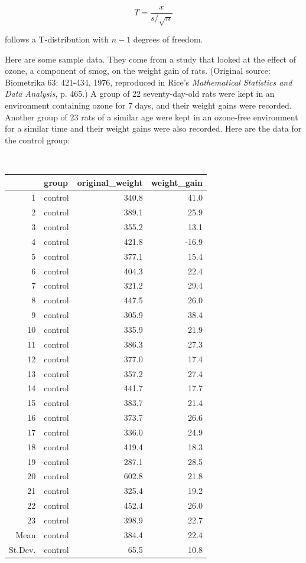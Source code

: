$$ T = \frac{\overline{x}}{s/\sqrt{n}}$$

\noindent follows a T-distribution with $n-1$ degrees of freedom. 

\begin{question}{}
Here are some sample data. They come from a study that looked at the effect of ozone, a component of smog, on the weight gain of rats. (Original source: Biometrika 63: 421-434, 1976, reproduced in Rice's \emph{Mathematical Statistics and Data Analysis}, p. 465.) A group of 22 seventy-day-old rats were kept in an environment containing ozone for $7$ days, and their weight gains were recorded. Another group of 23 rats of a similar age were kept in an ozone-free environment for a similar time and their weight gains were also recorded. Here are the data for the control group:

{\footnotesize \tt
\begin{center}
\begin{tabular}{rlrr}
  \toprule
  & group & original\_weight & weight\_gain \\ 
  \midrule
  1 & control & 340.8 & 41.0 \\ 
  2 & control & 389.1 & 25.9 \\ 
  3 & control & 355.2 & 13.1 \\ 
  4 & control & 421.8 & -16.9 \\ 
  5 & control & 377.1 & 15.4 \\ 
  6 & control & 404.3 & 22.4 \\ 
  7 & control & 321.2 & 29.4 \\ 
  8 & control & 447.5 & 26.0 \\ 
  9 & control & 305.9 & 38.4 \\ 
  10 & control & 335.9 & 21.9 \\ 
  11 & control & 386.3 & 27.3 \\ 
  12 & control & 377.0 & 17.4 \\ 
  13 & control & 357.2 & 27.4 \\ 
  14 & control & 441.7 & 17.7 \\ 
  15 & control & 383.7 & 21.4 \\ 
  16 & control & 373.7 & 26.6 \\ 
  17 & control & 336.0 & 24.9 \\ 
  18 & control & 419.4 & 18.3 \\ 
  19 & control & 287.1 & 28.5 \\ 
  20 & control & 602.8 & 21.8 \\ 
  21 & control & 325.4 & 19.2 \\ 
  22 & control & 452.4 & 26.0 \\ 
  23 & control & 398.9 & 22.7 \\ 
  \midrule
  Mean & control & 384.4 & 22.4 \\
  St.Dev. & control & 65.5 & 10.8 \\
  \bottomrule
\end{tabular}
\end{center}
}


\end{question}
